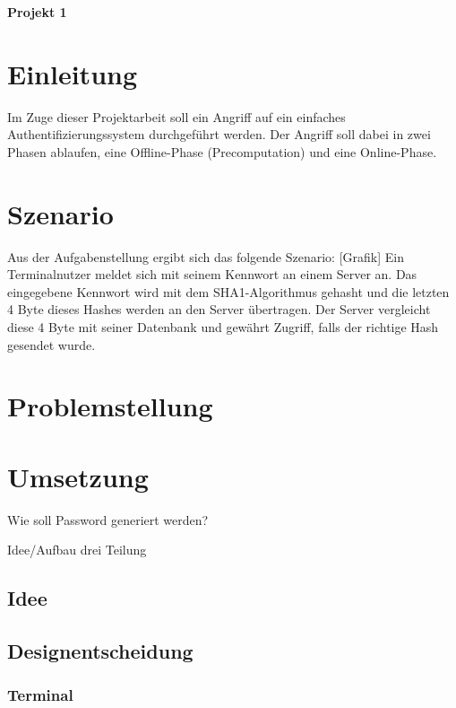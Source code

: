 \documentclass[a4paper,12pt]{article}
\begin{document}
\begin{center}
\Large
\textbf{Projekt 1}
\end{center}

\newpage
\tableofcontents
\newpage
\setcounter{tocdepth}{2}


\section{Einleitung}

Im Zuge dieser Projektarbeit soll ein Angriff auf ein einfaches Authentifizierungssystem durchgeführt werden.
Der Angriff soll dabei in zwei Phasen ablaufen, eine Offline-Phase (Precomputation) und eine Online-Phase.


\section{Szenario}

Aus der Aufgabenstellung ergibt sich das folgende Szenario:
[Grafik]
Ein Terminalnutzer meldet sich mit seinem Kennwort an einem Server an. Das eingegebene Kennwort wird mit dem SHA1-Algorithmus
gehasht und die letzten 4 Byte dieses Hashes werden an den Server übertragen. Der Server vergleicht diese 4 Byte mit seiner Datenbank
und gewährt Zugriff, falls der richtige Hash gesendet wurde.

\section{Problemstellung}


\section{Umsetzung}

Wie soll Password generiert werden?

Idee/Aufbau
drei Teilung

\subsection{Idee}

\subsection{Designentscheidung}

\subsubsection{Terminal}
\end{document}

